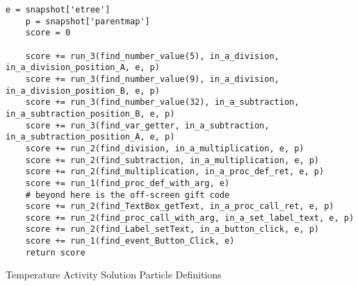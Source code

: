 \begin{listing}[]
\begin{verbatim}
e = snapshot['etree']
    p = snapshot['parentmap']
    score = 0

    score += run_3(find_number_value(5), in_a_division, in_a_division_position_A, e, p)
    score += run_3(find_number_value(9), in_a_division, in_a_division_position_B, e, p)
    score += run_3(find_number_value(32), in_a_subtraction, in_a_subtraction_position_B, e, p)
    score += run_3(find_var_getter, in_a_subtraction, in_a_subtraction_position_A, e, p)
    score += run_2(find_division, in_a_multiplication, e, p)
    score += run_2(find_subtraction, in_a_multiplication, e, p)
    score += run_2(find_multiplication, in_a_proc_def_ret, e, p)
    score += run_1(find_proc_def_with_arg, e)
    # beyond here is the off-screen gift code
    score += run_2(find_TextBox_getText, in_a_proc_call_ret, e, p)
    score += run_2(find_proc_call_with_arg, in_a_set_label_text, e, p)
    score += run_2(find_Label_setText, in_a_button_click, e, p)
    score += run_1(find_event_Button_Click, e)
    return score
\end{verbatim}
\caption{Temperature Activity Solution Particle Definitions}
\label{lst:temperature_test_definition}
\end{listing}

